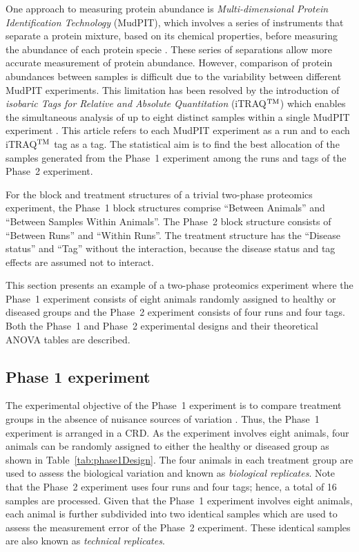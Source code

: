 \documentclass[article]{jss}
\begin{document}
One approach to measuring protein abundance is \emph{Multi-dimensional Protein Identification Technology} (MudPIT), which involves a series of instruments that separate a protein mixture, based on its chemical properties, before measuring the abundance of each protein specie \citep{Florens2006a}. These series of separations allow more accurate measurement of protein abundance. However, comparison of protein abundances between samples is difficult due to the variability between different MudPIT experiments. This limitation has been resolved by the introduction of \emph{isobaric Tags for Relative and Absolute Quantitation} (iTRAQ$^{\rm TM}$) which enables the simultaneous analysis of up to eight distinct samples within a single MudPIT experiment \citep{Ross2004, Choe2007}. This article refers to each MudPIT experiment as a run and to each iTRAQ$^{\rm TM}$ tag as a tag. The statistical aim is to find the best allocation of the samples generated from the Phase~1 experiment among the runs and tags of the Phase~2 experiment.

For the block and treatment structures of a trivial two-phase proteomics experiment, the Phase~1 block structures comprise ``Between Animals'' and ``Between Samples Within Animals''. The Phase~2 block structure consists of ``Between Runs'' and ``Within Runs''. The treatment structure has the ``Disease status'' and ``Tag'' without the interaction, because the disease status and tag effects are assumed not to interact.

This section presents an example of a two-phase proteomics experiment where the Phase~1 experiment consists of eight animals randomly assigned to healthy or diseased groups and the Phase~2 experiment consists of four runs and four tags. Both the Phase~1 and Phase~2 experimental designs and their theoretical ANOVA tables are described.

\subsection{Phase 1 experiment}
\label{subsec:Phase1Exp}
The experimental objective of the Phase~1 experiment is to compare treatment groups in the absence of nuisance sources of variation \citep{Mead1988}. Thus, the Phase~1 experiment is arranged in a CRD. As the experiment involves eight animals, four animals can be randomly assigned to either the healthy or diseased group as shown in Table~\ref{tab:phase1Design}. The four animals in each treatment group are used to assess the biological variation and known as \emph{biological replicates}. Note that the Phase~2 experiment uses four runs and four tags; hence, a total of 16 samples are processed. Given that the Phase~1 experiment involves eight animals, each animal is further subdivided into two identical samples which are used to assess the measurement error of the Phase~2 experiment. These identical samples are also known as \emph{technical replicates}.
\end{document}
